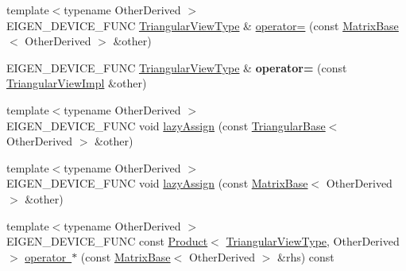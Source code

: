 \begin{DoxyCompactItemize}
\item 
{\footnotesize template$<$typename Other\+Derived $>$ }\\E\+I\+G\+E\+N\+\_\+\+D\+E\+V\+I\+C\+E\+\_\+\+F\+U\+NC \mbox{\hyperlink{class_eigen_1_1_triangular_view}{Triangular\+View\+Type}} \& \mbox{\hyperlink{class_eigen_1_1_triangular_view_impl_3_01___matrix_type_00_01___mode_00_01_dense_01_4_a66e679534fec114cd788ab8c43540bf7}{operator=}} (const \mbox{\hyperlink{class_eigen_1_1_matrix_base}{Matrix\+Base}}$<$ Other\+Derived $>$ \&other)
\item 
\mbox{\label{class_eigen_1_1_triangular_view_impl_3_01___matrix_type_00_01___mode_00_01_dense_01_4_a9343618303e0b3e83199872f9cb9255a}} 
E\+I\+G\+E\+N\+\_\+\+D\+E\+V\+I\+C\+E\+\_\+\+F\+U\+NC \mbox{\hyperlink{class_eigen_1_1_triangular_view}{Triangular\+View\+Type}} \& {\bfseries operator=} (const \mbox{\hyperlink{class_eigen_1_1_triangular_view_impl}{Triangular\+View\+Impl}} \&other)
\item 
{\footnotesize template$<$typename Other\+Derived $>$ }\\E\+I\+G\+E\+N\+\_\+\+D\+E\+V\+I\+C\+E\+\_\+\+F\+U\+NC void \mbox{\hyperlink{class_eigen_1_1_triangular_view_impl_3_01___matrix_type_00_01___mode_00_01_dense_01_4_a5adecc3719d26f559b831161b8117646}{lazy\+Assign}} (const \mbox{\hyperlink{class_eigen_1_1_triangular_base}{Triangular\+Base}}$<$ Other\+Derived $>$ \&other)
\item 
{\footnotesize template$<$typename Other\+Derived $>$ }\\E\+I\+G\+E\+N\+\_\+\+D\+E\+V\+I\+C\+E\+\_\+\+F\+U\+NC void \mbox{\hyperlink{class_eigen_1_1_triangular_view_impl_3_01___matrix_type_00_01___mode_00_01_dense_01_4_ae39e43f20246e45cebf6cd2a32530c63}{lazy\+Assign}} (const \mbox{\hyperlink{class_eigen_1_1_matrix_base}{Matrix\+Base}}$<$ Other\+Derived $>$ \&other)
\item 
{\footnotesize template$<$typename Other\+Derived $>$ }\\E\+I\+G\+E\+N\+\_\+\+D\+E\+V\+I\+C\+E\+\_\+\+F\+U\+NC const \mbox{\hyperlink{class_eigen_1_1_product}{Product}}$<$ \mbox{\hyperlink{class_eigen_1_1_triangular_view}{Triangular\+View\+Type}}, Other\+Derived $>$ \mbox{\hyperlink{class_eigen_1_1_triangular_view_impl_3_01___matrix_type_00_01___mode_00_01_dense_01_4_a995853451299cd289510b1c3d0923155}{operator $\ast$}} (const \mbox{\hyperlink{class_eigen_1_1_matrix_base}{Matrix\+Base}}$<$ Other\+Derived $>$ \&rhs) const

\end{DoxyCompactItemize}
